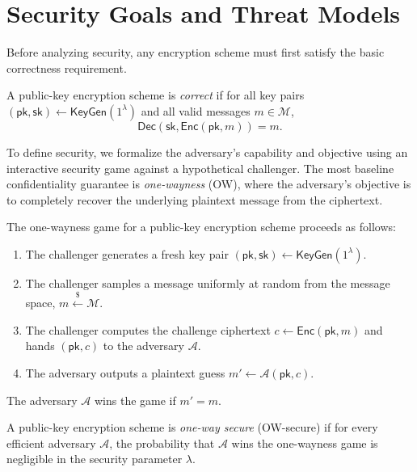 \section*{Security Goals and Threat Models}

Before analyzing security, any encryption scheme must first satisfy the basic correctness requirement.

\begin{definition}[Correctness]
    A public-key encryption scheme is \emph{correct} if for all key pairs \((\mathsf{pk}, \mathsf{sk}) \gets \mathsf{KeyGen}(1^\lambda)\) and all valid messages \(m \in \mathcal{M}\),
    \[
        \mathsf{Dec}(\mathsf{sk}, \mathsf{Enc}(\mathsf{pk}, m)) = m.
    \]
\end{definition}

To define security, we formalize the adversary's capability and objective using an interactive security game against a hypothetical challenger.
The most baseline confidentiality guarantee is \emph{one-wayness} (OW), where the adversary's objective is to completely recover the underlying plaintext message from the ciphertext.

\begin{definition}
    The one-wayness game for a public-key encryption scheme proceeds as follows:
    \begin{enumerate}
        \item The challenger generates a fresh key pair \((\mathsf{pk}, \mathsf{sk}) \gets \mathsf{KeyGen}(1^\lambda)\).
        \item The challenger samples a message uniformly at random from the message space, \(m \xleftarrow{\$} \mathcal{M}\).
        \item The challenger computes the challenge ciphertext \(c \gets \mathsf{Enc}(\mathsf{pk}, m)\) and hands \((\mathsf{pk}, c)\) to the adversary \(\mathcal{A}\).
        \item The adversary outputs a plaintext guess \(m' \gets \mathcal{A}(\mathsf{pk}, c)\).
    \end{enumerate}
    The adversary \(\mathcal{A}\) wins the game if \(m' = m\).
\end{definition}

\begin{definition}
    A public-key encryption scheme is \emph{one-way secure} (OW-secure) if for every efficient adversary \(\mathcal{A}\), the probability that \(\mathcal{A}\) wins the one-wayness game is negligible in the security parameter \(\lambda\).
\end{definition}

